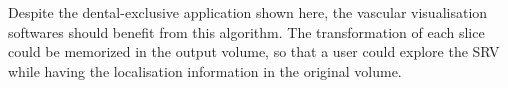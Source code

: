 \documentclass{InsightArticle}
\begin{document}
Despite the dental-exclusive application shown here, the vascular visualisation
softwares should benefit from this algorithm. The transformation of each slice
could be memorized in the output volume, so that a user could explore the SRV
while having the localisation information in the original volume.
%
\appendix
%
%
%
%


%
\end{document}
